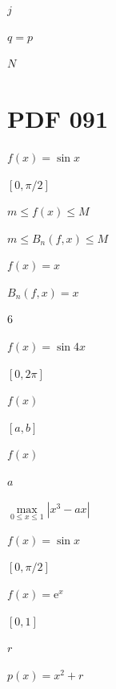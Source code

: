 \documentclass[UTF8,fontset=fandol,a4paper]{ctexart}
\begin{document}
\noindent $j$\par

\noindent $q=p$\par

\noindent $N$\par

\section*{PDF 091}

\noindent $f(x)=\sin x$\par

\noindent $[0,\pi/2]$\par

\noindent $m\leqslant f(x)\leqslant M$\par

\noindent $m\leqslant B_n(f,x)\leqslant M$\par

\noindent $f(x)=x$\par

\noindent $B_n(f,x)=x$\par

\noindent $6$\par

\noindent $f(x)=\sin4x$\par

\noindent $[0,2\pi]$\par

\noindent $f(x)$\par

\noindent $[a,b]$\par

\noindent $f(x)$\par

\noindent $a$\par

\noindent $\max\limits_{0\leqslant x\leqslant1}|x^3-ax|$\par

\noindent $f(x)=\sin x$\par

\noindent $[0,\pi/2]$\par

\noindent $f(x)=\mathrm e^x$\par

\noindent $[0,1]$\par

\noindent $r$\par

\noindent $p(x)=x^2+r$\par
\end{document}
